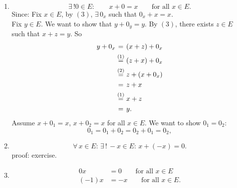 \begin{bemerkung}
	\begin{enumerate}[(1)]
		\item \[
			\exists\,! 0 \in E: \qquad x + 0 = x \qquad \text{for all }x \in E.
		\]
		Since: Fix $x \in E$, by $(3)$, $\exists\, 0_x$ such that $0_x + x =x$. \\
		Fix $y \in E$. We want to show that $y + 0_y = y$. By $(3)$, there exists $z \in E$ such that $x+z = y$. So
		\begin{align*}
			y + 0_x & \stackrel{\hphantom{(1)}}{=} (x+z)+ 0_x \\
			&\stackrel{(1)}{=} (z+x)+ 0_x \\
			&\stackrel{(2)}{=} z + (x + 0_x) \\
			&\stackrel{\hphantom{(1)}}{=} z+x \\
			&\stackrel{(1)}{=}x+z \\
			&\stackrel{\hphantom{(1)}}{=} y.
		\end{align*}
		Assume $x+ 0_1 = x$, $x+ 0_2 =x$ for all $x \in E$. We want to show $0_1 = 0_2$:
		\[
			0_1 = 0_1 + 0_2 = 0_2 + 0_1 = 0_2,
		\]
		\item 
		\[
			\forall\, x \in E: \, \exists\,! \,-x \in E: \,x+(-x)=0.
		\]
		proof: exercise.
		\item \begin{align*}
			0x &=0 \qquad \text{for all }x \in E \\
			(-1)x &= -x \qquad \text{for all }x \in E.
		\end{align*}
	\end{enumerate}
\end{bemerkung}
